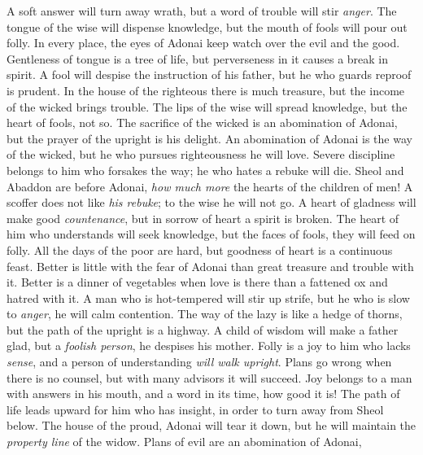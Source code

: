 \begin{biblechapter} %
\verse A soft answer will turn away wrath, 
but a word of trouble will stir \textit{anger}.
\verse The tongue of the wise will dispense knowledge, 
but the mouth of fools will pour out folly.
\verse In every place, the eyes of Adonai 
keep watch over the evil and the good.
\verse Gentleness of tongue is a tree of life, 
but perverseness in it causes a break in spirit.
\verse A fool will despise the instruction of his father, 
but he who guards reproof is prudent.
\verse In the house of the righteous there is much treasure, 
but the income of the wicked brings trouble.
\verse The lips of the wise will spread knowledge, 
but the heart of fools, not so.
\verse The sacrifice of the wicked is an abomination of Adonai, 
but the prayer of the upright is his delight.
\verse An abomination of Adonai is the way of the wicked, 
but he who pursues righteousness he will love.
\verse Severe discipline belongs to him who forsakes the way; 
he who hates a rebuke will die.
\verse Sheol and Abaddon are before Adonai, 
\textit{how much more} the hearts of the children of men!
\verse A scoffer does not like \textit{his rebuke}; 
to the wise he will not go.
\verse A heart of gladness will make good \textit{countenance}, 
but in sorrow of heart a spirit is broken.
\verse The heart of him who understands will seek knowledge, 
but the faces of fools, they will feed on folly.
\verse All the days of the poor are hard, 
but goodness of heart is a continuous feast.
\verse Better is little with the fear of Adonai 
than great treasure and trouble with it.
\verse Better is a dinner of vegetables when love is there 
than a fattened ox and hatred with it.
\verse A man who is hot-tempered will stir up strife, 
but he who is slow to \textit{anger}, he will calm contention.
\verse The way of the lazy is like a hedge of thorns, 
but the path of the upright is a highway.
\verse A child of wisdom will make a father glad, 
but a \textit{foolish person}, he despises his mother.
\verse Folly is a joy to him who lacks \textit{sense}, 
and a person of understanding \textit{will walk upright}.
\verse Plans go wrong when there is no counsel, 
but with many advisors it will succeed.
\verse Joy belongs to a man with answers in his mouth, 
and a word in its time, how good it is!
\verse The path of life leads upward for him who has insight, 
in order to turn away from Sheol below.
\verse The house of the proud, Adonai will tear it down, 
but he will maintain the \textit{property line} of the widow.
\verse Plans of evil are an abomination of Adonai, 

\end{biblechapter}
